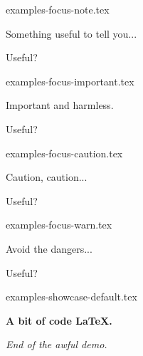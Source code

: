 \begin{filecontents*}[overwrite]{examples-focus-note.tex}
\begin{tdocnote}
    Something useful to tell you...
\end{tdocnote}

\begin{tdocnote}
    Useful?
\end{tdocnote}
\end{filecontents*}


\begin{filecontents*}[overwrite]{examples-focus-important.tex}
\begin{tdocimportant}
    Important and harmless.
\end{tdocimportant}

\begin{tdocimportant}
    Useful?
\end{tdocimportant}
\end{filecontents*}


\begin{filecontents*}[overwrite]{examples-focus-caution.tex}
\begin{tdoccaution}
    Caution, caution...
\end{tdoccaution}

\begin{tdoccaution}
    Useful?
\end{tdoccaution}
\end{filecontents*}


\begin{filecontents*}[overwrite]{examples-focus-warn.tex}
\begin{tdocwarn}
    Avoid the dangers...
\end{tdocwarn}

\begin{tdocwarn}
    Useful?
\end{tdocwarn}
\end{filecontents*}


\begin{filecontents*}[overwrite]{examples-showcase-default.tex}
\begin{tdocshowcase}
    \bfseries A bit of code \LaTeX.

    \bigskip

    \emph{\large End of the awful demo.}
\end{tdocshowcase}
\end{filecontents*}


